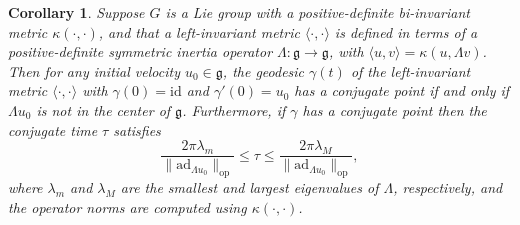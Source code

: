 \documentclass[oneside, 11pt]{amsart}
\newtheorem{corollary}[theorem]{Corollary}
\numberwithin{equation}{section}
\newcommand{\ad}{\mathrm{ad}}
\newcommand{\bim}{\kappa}
\begin{document}
\begin{corollary}\label{easyconjugatethm}
Suppose $G$ is a Lie group with a positive-definite bi-invariant metric $\bim(\cdot,\cdot)$, and that a left-invariant metric $\langle \cdot,\cdot\rangle$ is defined in terms of a positive-definite symmetric inertia operator $\Lambda\colon\mathfrak{g}\to\mathfrak{g}$, with $\langle u,v\rangle = \bim(u,\Lambda v)$. Then for any initial velocity $u_0 \in \mathfrak{g}$, the geodesic $\gamma(t)$ of the left-invariant metric $\langle\cdot,\cdot\rangle$ with $\gamma(0) = \mathrm{id}$ and $\gamma'(0) = u_{0}$ has a conjugate point if and only if $\Lambda u_0$ is not in the center of $\mathfrak{g}$. Furthermore, if $\gamma$ has a conjugate point then the conjugate time $\tau$ satisfies
$$\frac{2\pi \lambda_m}{\lVert \ad_{\Lambda u_0}\rVert_{\text{op}}} \leq  \tau \leq \frac{2\pi \lambda_M}{\lVert \ad_{\Lambda u_0}\rVert_{\text{op}}},$$
where $\lambda_m$ and $\lambda_M$ are the smallest and largest eigenvalues of $\Lambda$, respectively, and the operator norms are computed using $\bim(\cdot, \cdot)$.
\end{corollary}
\end{document}
